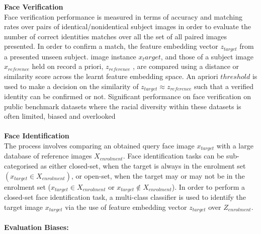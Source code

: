 \documentclass[12pt]{article}
\begin{document}
\textbf{Face Verification}\\
Face verification
performance is measured in terms of accuracy and matching rates over pairs of identical/nonidentical subject images in order to evaluate the number of correct identities matches over all the set of all paired
images presented. In order to confirm a match, the feature embedding vector $z_{target}$ from a presented unseen subject. image instance $x_target$, and those of a subject image $x_{reference}$ held on record a priori, $z_{reference}$ , are compared using a distance or similarity score across the learnt feature embedding space. An apriori
$threshold$ is used to make a decision on the similarity of $z_{target}\approx z_{reference}$ such that a verified identity can be confirmed or not. Significant performance on face verification on public benchmark datasets where the racial diversity within these datasets is often limited, biased and overlooked \\
\\
\textbf{Face Identification}\\
The process involves comparing an obtained query face image $x_{target}$ with a large database of reference images $X_{enrolment}$. Face identification tasks can be sub-categorised as either closed-set, when the target is
always in the enrolment set $(x_{target} \in X_{enrolment})$, or open-set, when the target may or may not be in the enrolment
set ($x_{target} \in  X_{enrolment}$ or $x_{target} \notin X_{enrolment}$).  In order to perform a closed-set face identification task, a multi-class
classifier is used to identify the target image $x_{target}$ via the use of feature embedding vector $z_{target}$ over $Z_{enrolment}$.\\
\\
\textbf{Evaluation Biases:}
\end{document}
